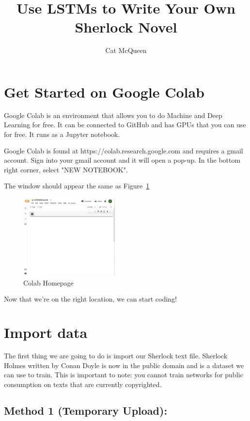 \documentclass{article}
\title{Use LSTMs to Write Your Own Sherlock Novel}
\author{Cat McQueen}
\begin{document}
\maketitle

\tableofcontents

\section{Get Started on Google Colab}

Google Colab is an environment that allows you to do Machine and Deep Learning for free. It can be connected to GitHub and has GPUs that you can use for free. It runs as a Jupyter notebook.

Google Colab is found at https://colab.research.google.com and requires a gmail account. Sign into your gmail account and it will open a pop-up. 
In the bottom right corner, select "NEW NOTEBOOK".

The window should appear the same as Figure~\ref{fig:home}

\begin{figure}[h!]
\centering
\includegraphics[width=50mm]{ColabHome.png}
\caption{Colab Homepage}
\label{fig:home}
\end{figure}

Now that we're on the right location, we can start coding!

\section{Import data}

The first thing we are going to do is import our Sherlock text file. Sherlock Holmes written by Conan Doyle is now in the public domain and is a dataset we can use to train. This is important to note: you cannot train networks for public consumption on texts that are currently copyrighted.

\subsection{Method 1 (Temporary Upload):} 
\end{document}
